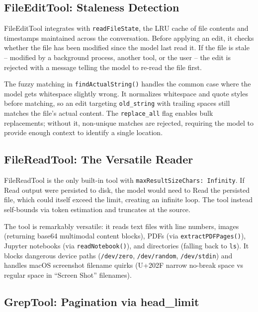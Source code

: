 \documentclass[
  english,
  11pt,
  letterpaper,
]{book}
\begin{document}
\subsection{FileEditTool: Staleness
Detection}\label{fileedittool-staleness-detection}

FileEditTool integrates with \texttt{readFileState}, the LRU cache of
file contents and timestamps maintained across the conversation. Before
applying an edit, it checks whether the file has been modified since the
model last read it. If the file is stale -- modified by a background
process, another tool, or the user -- the edit is rejected with a
message telling the model to re-read the file first.

The fuzzy matching in \texttt{findActualString()} handles the common
case where the model gets whitespace slightly wrong. It normalizes
whitespace and quote styles before matching, so an edit targeting
\texttt{old\_string} with trailing spaces still matches the file's
actual content. The \texttt{replace\_all} flag enables bulk
replacements; without it, non-unique matches are rejected, requiring the
model to provide enough context to identify a single location.

\subsection{FileReadTool: The Versatile
Reader}\label{filereadtool-the-versatile-reader}

FileReadTool is the only built-in tool with
\texttt{maxResultSizeChars:\ Infinity}. If Read output were persisted to
disk, the model would need to Read the persisted file, which could
itself exceed the limit, creating an infinite loop. The tool instead
self-bounds via token estimation and truncates at the source.

The tool is remarkably versatile: it reads text files with line numbers,
images (returning base64 multimodal content blocks), PDFs (via
\texttt{extractPDFPages()}), Jupyter notebooks (via
\texttt{readNotebook()}), and directories (falling back to \texttt{ls}).
It blocks dangerous device paths (\texttt{/dev/zero},
\texttt{/dev/random}, \texttt{/dev/stdin}) and handles macOS screenshot
filename quirks (U+202F narrow no-break space vs regular space in
``Screen Shot'' filenames).

\subsection{GrepTool: Pagination via
head\_limit}\label{greptool-pagination-via-head_limit}
\end{document}
